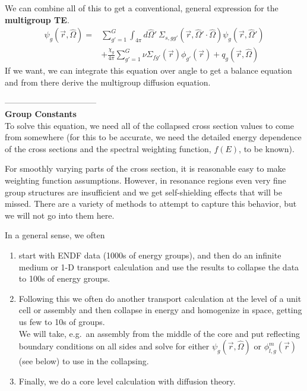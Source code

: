 \documentclass[12pt]{article}
\newcommand{\vecr}{\ensuremath{\vec{r}}}
\newcommand{\vOmega}{\ensuremath{\hat{\Omega}}}
\begin{document}
%
We can combine all of this to get a conventional, general expression for the \textbf{multigroup TE}.
\begin{align*}
[\vOmega \cdot \nabla + \Sigma_{tg}(\vec{r})]\psi_g(\vec{r}, \vOmega) =&  \sum_{g'=1}^G \int_{4 \pi} d\vOmega'\: \Sigma_{s,gg'}(\vecr, \vOmega' \cdot \vOmega) \psi_g(\vec{r}, \vOmega')\\
&+\frac{\chi_g}{4 \pi}\sum_{g'=1}^G \nu\Sigma_{fg'}(\vec{r}) \phi_{g'}(\vec{r}) + q_g(\vec{r}, \vOmega)
\end{align*}
If we want, we can integrate this equation over angle to get a balance equation and from there derive the multigroup diffusion equation.

---------------------------------\\
\textbf{Group Constants}\\
To solve this equation, we need all of the collapsed cross section values to come from somewhere (for this to be accurate, we need the detailed energy dependence of the cross sections and the spectral weighting function, $f(E)$, to be known). 

For smoothly varying parts of the cross section, it is reasonable easy to make weighting function assumptions. However, in resonance regions even very fine group structures are insufficient and we get self-shielding effects that will be missed. There are a variety of methods to attempt to capture this behavior, but we will not go into them here.

In a general sense, we often 
\begin{enumerate}
\item start with ENDF data (1000s of energy groups), and then do an infinite medium or 1-D transport calculation and use the results to collapse the data to 100s of energy groups.

\item Following this we often do another transport calculation at the level of a unit cell or assembly and then collapse in energy and homogenize in space, getting us few to 10s of groups.\\
We will take, e.g.\ an assembly from the middle of the core and put reflecting boundary conditions on all sides and solve for either $\psi_g(\vec{r}, \vOmega)$ or $\phi_{l,g}^m(\vec{r})$ (see below) to use in the collapsing.

\item Finally, we do a core level calculation with diffusion theory. 
\end{enumerate}
\end{document}
